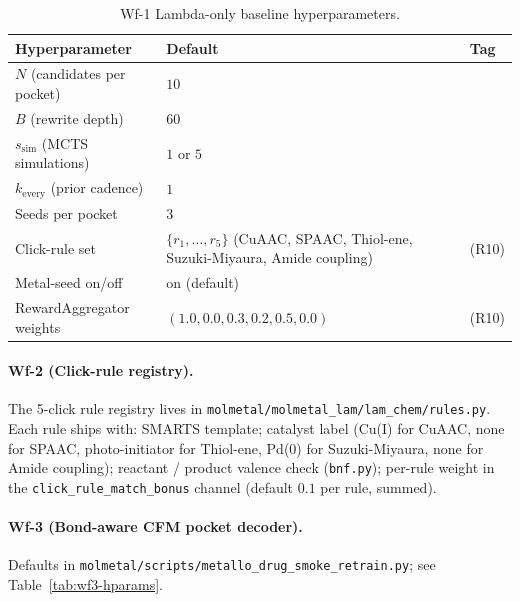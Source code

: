 \begin{table}[h]
  \centering
  \small
  \caption{Wf-1 Lambda-only baseline hyperparameters.}
  \label{tab:wf1-hparams}
  \begin{tabular}{lll}
    \toprule
    \textbf{Hyperparameter} & \textbf{Default} & \textbf{Tag} \\
    \midrule
    $N$ (candidates per pocket) & $10$ & \DESIGN{} \\
    $B$ (rewrite depth) & $60$ & \DESIGN{} \\
    $s_{\mathrm{sim}}$ (MCTS simulations) & $1$ or $5$
      & \DESIGN{} \\
    $k_{\mathrm{every}}$ (prior cadence) & $1$ & \DESIGN{} \\
    Seeds per pocket & $3$ & \DESIGN{} \\
    Click-rule set & $\{r_{1}, \dots, r_{5}\}$ (CuAAC, SPAAC,
      Thiol-ene, Suzuki-Miyaura, Amide coupling) & \MEASURED{} (R10) \\
    Metal-seed on/off & on (default) & \DESIGN{} \\
    RewardAggregator weights & $(1.0, 0.0, 0.3, 0.2, 0.5, 0.0)$
      & \MEASURED{} (R10) \\
    \bottomrule
  \end{tabular}
\end{table}

\paragraph{Wf-2 (Click-rule registry).}
The 5-click rule registry lives in
\texttt{molmetal/molmetal\_lam/lam\_chem/rules.py}.  Each rule
ships with: SMARTS template; catalyst label (Cu(I) for CuAAC,
none for SPAAC, photo-initiator for Thiol-ene, Pd(0) for
Suzuki-Miyaura, none for Amide coupling); reactant / product
valence check (\texttt{bnf.py}); per-rule weight in the
\texttt{click\_rule\_match\_bonus} channel (default $0.1$ per
rule, summed).

\paragraph{Wf-3 (Bond-aware CFM pocket decoder).}
Defaults in
\texttt{molmetal/scripts/metallo\_drug\_smoke\_retrain.py}; see
Table~\ref{tab:wf3-hparams}.

